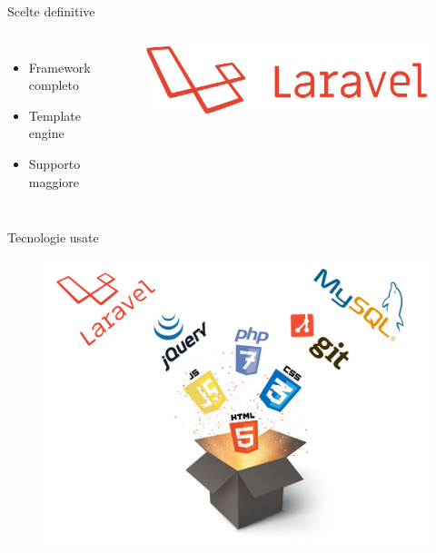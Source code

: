 \documentclass{beamer}
\begin{document}
\begin{frame}{Scelte definitive}
\begin{columns}
		\begin{itemize}
			\item Framework completo
			\item Template engine
			\item Supporto maggiore
			
		\end{itemize}
	\begin{figure}[!h]
		\includegraphics[scale=0.04]{Laravel-logo.png}
	\end{figure}
\end{columns}
\end{frame}

\begin{frame}{Tecnologie usate}
	\begin{figure}[!h]
		\includegraphics[scale=0.59]{tecnologie.jpg}
	\end{figure}
\end{frame}

\end{document}
